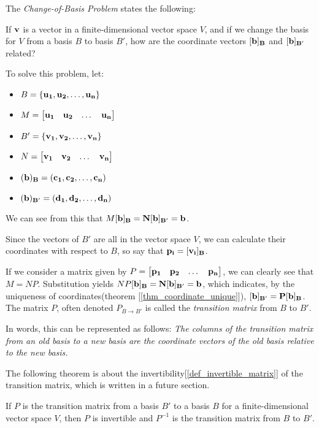 \documentclass{report}
\begin{document}
	The \emph{Change-of-Basis Problem} states the following:
	
	If $\bf{v}$ is a vector in a finite-dimensional vector space $V$, and if we change the basis for $V$ from a basis $B$ to basis $B'$, how are the coordinate vectors $[\bf{b}]_B$ and $[\bf{b}]_{B'}$ related?
	
	To solve this problem, let:
	\begin{itemize}
		\item $B=\{\bf{u_1},\bf{u_2},\dots,\bf{u_n}\}$
		\item $M=\begin{bmatrix} \bf{u_1} & \bf{u_2} & \dots & \bf{u_n} \end{bmatrix}$
		\item $B'=\{\bf{v_1},\bf{v_2},\dots,\bf{v_n}\}$
		\item $N=\begin{bmatrix} \bf{v_1} & \bf{v_2} & \dots & \bf{v_n} \end{bmatrix}$
		\item $(\bf{b})_B=(c_1,c_2,\dots,c_n)$
		\item $(\bf{b})_{B'}=(d_1,d_2,\dots,d_n)$
	\end{itemize}
	
	We can see from this that $M[\bf{b}]_B=N[\bf{b}]_{B'}=\bf{b}$.
	
	Since the vectors of $B'$ are all in the vector space $V$, we can calculate their coordinates with respect to $B$, so say that $\bf{p_i}=[\bf{v_i}]_B$.
	
	If we consider a matrix given by $P=\begin{bmatrix} \bf{p_1} & \bf{p_2} & \dots & \bf{p_n} \end{bmatrix}$, we can clearly see that $M=NP$. Substitution yields $NP[\bf{b}]_B=N[\bf{b}]_{B'}=\bf{b}$, which indicates, by the uniqueness of coordinates(theorem [\ref{thm_coordinate_unique}]), $[\bf{b}]_{B'}=P[\bf{b}]_B$. The matrix $P$, often denoted $P_{B \rightarrow B'}$ is called the \emph{transition matrix} from $B$ to $B'$.
	
	In words, this can be represented as follows: \textit{The columns of the transition matrix from an old basis to a new basis are the coordinate vectors of the old basis relative to the new basis.}
	
	The following theorem is about the invertibility[\ref{def_invertible_matrix}] of the transition matrix, which is written in a future section.
	
	\begin{thm}
		If $P$ is the transition matrix from a basis $B'$ to a basis $B$ for a finite-dimensional vector space $V$, then $P$ is invertible and $P^{-1}$ is the transition matrix from $B$ to $B'$.
	\end{thm}
	
\end{document}
